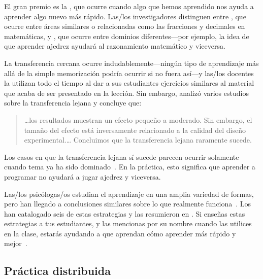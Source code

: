 El gran premio es la ,
que ocurre cuando algo que hemos aprendido nos ayuda a aprender algo nuevo más rápido.
Las/los investigadores distinguen entre ,
que ocurre entre áreas similares o relacionadas como las fracciones y decimales en matemáticas,
y ,
que ocurre entre dominios diferentes---por ejemplo,
la idea de que aprender ajedrez ayudará al razonamiento matemático y viceversa.

La transferencia cercana ocurre indudablemente---ningún tipo de aprendizaje
más allá de la simple memorización podría ocurrir si no fuera así---y
las/los docentes la utilizan todo el tiempo
al dar a sus estudiantes ejercicios similares al material que acaba de ser presentado en la lección.
Sin embargo,
\cite{Sala2017} analizó varios estudios sobre la transferencia lejana
y concluye que:

\begin{quote}

  {\ldots}los resultados muestran un efecto pequeño a moderado.
  Sin embargo, el tamaño del efecto está inversamente relacionado a la calidad del diseño experimental.{\ldots}
  Concluimos que la transferencia lejana raramente sucede.

\end{quote}

Los casos en que la transferencia lejana sí sucede
parecen ocurrir solamente cuando tema ya ha sido dominado~\cite{Gick1987}.
En la práctica,
esto significa que aprender a programar no ayudará a jugar ajedrez y viceversa.


Las/los psicólogas/os estudian el aprendizaje en una amplia variedad de formas,
pero han llegado a conclusiones similares sobre lo que realmente funciona~\cite{Mark2018}.
Los 
han catalogado seis de estas estrategias y
las resumieron en .
Si enseñas estas estrategias a tus estudiantes,
y las mencionas por su nombre cuando las utilices en la clase,
estarás ayudando a que aprendan cómo aprender más rápido y mejor~\cite{Wein2018a,Wein2018b}.

\subsection*{Práctica distribuida}


